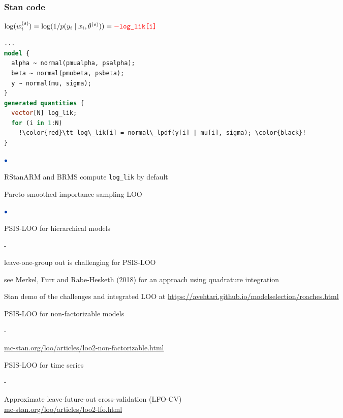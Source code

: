 \documentclass[english,t]{beamer}
\newenvironment{list1}{
   \begin{list}{$\color{list1}\bullet$}{\itemsep=6pt}}{
  \end{list}}
\newenvironment{list2}{
  \begin{list}{-}{\baselineskip=12pt\itemsep=2pt}}{
  \end{list}}
\begin{document}
\begin{frame}[fragile]
  \frametitle{Stan code }

  \vspace{\baselineskip}
  $ \log(w_i^{(s)}) = \log(1/p(y_i \mid x_i,\theta^{(s)})) = {\color{red}-\texttt{log\_lik[i]}}$
  \vspace{\baselineskip}

  \pause
  {\small
\begin{lstlisting}[language=Stan,escapechar=!]
...
model {
  alpha ~ normal(pmualpha, psalpha);
  beta ~ normal(pmubeta, psbeta);
  y ~ normal(mu, sigma);
}
generated quantities {
  vector[N] log_lik;
  for (i in 1:N)
    !\color{red}\tt log\_lik[i] = normal\_lpdf(y[i] | mu[i], sigma); \color{black}!
}
\end{lstlisting}
  }

  \begin{list1}
  \item<3-> RStanARM and BRMS compute {\color{red}\texttt{log\_lik}} by default
  \end{list1}
  
\end{frame}

\begin{frame}{Pareto smoothed importance sampling LOO}

\begin{list1}
\item PSIS-LOO for hierarchical models
  \begin{list2}
  \item leave-one-group out is challenging for PSIS-LOO\\ \vspace{0.2\baselineskip}
    
  \item {\small see Merkel, Furr and Rabe-Hesketh
      (2018) for an approach using quadrature integration}
  \item Stan demo of the challenges and integrated LOO at \url{https://avehtari.github.io/modelselection/roaches.html}
  \end{list2}
  \item<2-> PSIS-LOO for non-factorizable models
    \begin{list2}
    \item {\url{mc-stan.org/loo/articles/loo2-non-factorizable.html}}
    \end{list2}
  \item<3-> PSIS-LOO for time series
  \begin{list2}
  \item Approximate leave-future-out cross-validation (LFO-CV) \\ \vspace{0.2\baselineskip}
    {\url{mc-stan.org/loo/articles/loo2-lfo.html}}
  \end{list2}
\end{list1}

\end{frame}
\end{document}
